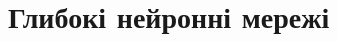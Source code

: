 \documentclass[14pt,a4paper]{extarticle}
\newcounter{e}
\newcommand{\n}{\refstepcounter{e} (\arabic{e})}
\newcounter{pic}
\newcommand{\pic}[1]{\refstepcounter{pic} \vspace{-0.3cm}\textit{Рисунок \arabic{pic}\label{#1}.}}
\numberwithin{equation}{section}
\numberwithin{figure}{section}
\begin{document}
 
 
 \newpage
 \thispagestyle{empty}
 \section{Глибокі нейронні мережі}
 
 

\end{document}
